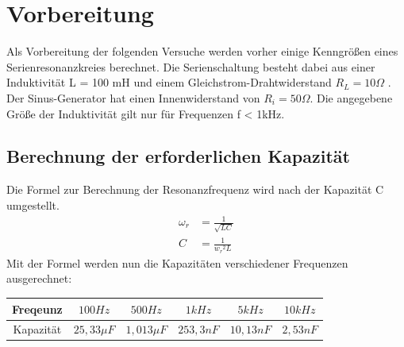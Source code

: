 \documentclass{article}
\begin{document}
\newpage
\thispagestyle{empty}

\tableofcontents


\newpage


\section{Vorbereitung}
Als Vorbereitung der folgenden Versuche werden vorher einige Kenngrößen eines Serienresonanzkreies berechnet.
Die Serienschaltung besteht dabei aus einer Induktivität L = 100 mH und einem Gleichstrom-Drahtwiderstand $R_L = 10 \Omega$ . Der Sinus-Generator
hat einen Innenwiderstand von $R_i = 50\Omega$. Die angegebene Größe der Induktivität gilt nur für Frequenzen f < 1kHz.

\subsection{Berechnung der erforderlichen Kapazität}
Die Formel zur Berechnung der Resonanzfrequenz wird nach der Kapazität C umgestellt.
\begin{align*}
  \omega_r & = \frac{1}{\sqrt{LC}} \\
  C        & = \frac{1}{{w_r}^2L}
\end{align*}
Mit der Formel werden nun die Kapazitäten verschiedener Frequenzen ausgerechnet:
\begin{table}
\begin{center}
  \begin{tabular}{|c|c|c|c|c|c|}    
    \hline
    Freqeunz               & $100 Hz$                   & $500Hz$                   & $1kHz$            & $5kHz$          & $10kHz$              \\
    \hline
    Kapazität              & $25,33\mu F$                      & $1,013\mu F$                     & $253,3nF$            & $10,13nF$           & $2,53nF$              \\
    \hline
  \end{tabular}

\end{center}
\end{table}
\end{document}
